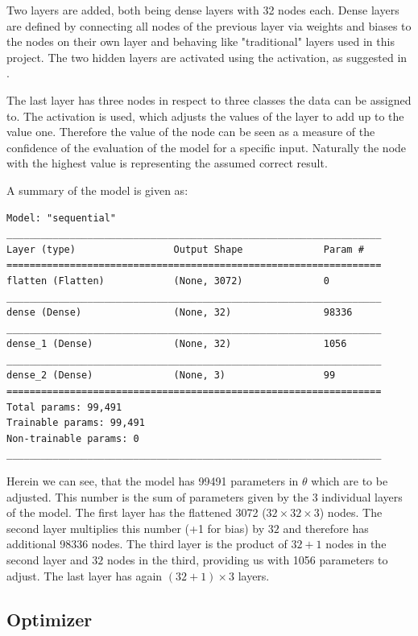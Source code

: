 Two layers are added, both being dense layers with 32 nodes each.
Dense layers are defined by connecting all nodes of the previous layer via weights and biases to the nodes on their own layer and behaving like "traditional" layers used in this project.
The two hidden layers are activated using the  activation, as suggested in \cite[p.168]{Goodfellow2017}.

The last layer has three nodes in respect to three classes the data can be assigned to.
The  activation is used, which adjusts the values of the layer to add up to the value one.
Therefore the value of the node can be seen as a measure of the confidence of the evaluation of the model for a specific input.
Naturally the node with the highest value is representing the assumed correct result.

A summary of the model is given as:
\begin{lstlisting}
Model: "sequential"
_________________________________________________________________
Layer (type)                 Output Shape              Param #   
=================================================================
flatten (Flatten)            (None, 3072)              0         
_________________________________________________________________
dense (Dense)                (None, 32)                98336     
_________________________________________________________________
dense_1 (Dense)              (None, 32)                1056      
_________________________________________________________________
dense_2 (Dense)              (None, 3)                 99        
=================================================================
Total params: 99,491
Trainable params: 99,491
Non-trainable params: 0
_________________________________________________________________
\end{lstlisting}

Herein we can see, that the model has 99491 parameters in $\theta$ which are to be adjusted. This number is the sum of parameters given by the 3 individual layers of the model.
The first layer has the flattened 3072 ($32 \times 32 \times 3$) nodes.
The second layer multiplies this number (+1 for bias) by $32$ and therefore has additional 98336 nodes.
The third layer is the product of $32 + 1$ nodes in the second layer and $32$ nodes in the third, providing us with 1056 parameters to adjust.
The last layer has again $(32 + 1) \times 3$ layers.

\subsection{Optimizer}

